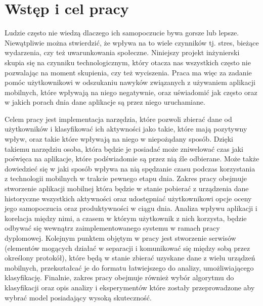 \documentclass[a4paper,twoside,12pt]{book}
\newcounter{stronyPozaNumeracja}
\begin{document}
\vfill

 

\cleardoublepage


\pagestyle{tylkoNumeryStron}
\tableofcontents

\setcounter{stronyPozaNumeracja}{\value{page}}
\mainmatter
\pagestyle{NumeryStronNazwyRozdzialow}


\chapter{Wstęp i cel pracy}
\label{chap:intro}

Ludzie często nie wiedzą dlaczego ich samopoczucie bywa gorsze lub lepsze. Niewątpliwie można stwierdzić, że wpływa na to wiele czynników tj. stres, bieżące wydarzenia, czy też uwarunkowania społeczne. Niniejszy projekt inżynierski skupia się na czynniku technologicznym, który otacza nas wszystkich często nie pozwalając na moment skupienia, czy też wyciszenia. Praca ma więc za zadanie pomóc użytkownikowi w odszukaniu nawyków związanych z używaniem aplikacji mobilnych, które wpływają na niego negatywnie, oraz uświadomić jak często oraz w jakich porach dnia dane aplikacje są przez niego uruchamiane.     

Celem pracy jest implementacja narzędzia, które pozwoli zbierać dane od użytkowników i klasyfikować ich aktywności jako takie, które mają pozytywny wpływ, oraz takie które wpływają na niego w niepożądany sposób. Dzięki takiemu narzędziu osoba, która będzie je posiadać może zniwelować czas jaki poświęca na aplikacje, które podświadomie są przez nią źle odbierane. Może także dowiedzieć się w jaki sposób wpływa na nią spędzanie czasu podczas korzystania z technologii mobilnych w trakcie pewnego etapu dnia.
Zakres pracy obejmuje stworzenie aplikacji mobilnej która będzie w stanie pobierać z urządzenia dane historyczne wszystkich aktywności oraz udostępniać użytkownikowi opcje oceny jego samopoczucia oraz produktywności w ciągu dnia. Analiza wpływu aplikacji i korelacja między nimi, a czasem w którym użytkownik z nich korzysta, będzie odbywać się wewnątrz zaimplementowanego systemu w ramach pracy dyplomowej. Kolejnym punktem objętym w pracy jest stworzenie serwisów (elementów mogących działać w separacji i komunikować się między sobą przez określony protokół), które będą w stanie zbierać uzyskane dane z wielu urządzeń mobilnych, przekształcać je do formatu łatwiejszego do analizy, umożliwiającego klasyfikację. Finalnie, zakres pracy obejmuje również wybór algorytmu do klasyfikacji oraz opis analizy i eksperymentów które zostały przeprowadzone aby wybrać model posiadający wysoką skuteczność. 
\end{document}
